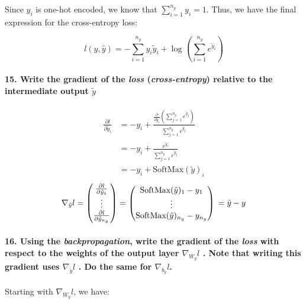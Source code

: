 Since $y_i$ is one-hot encoded, we know that $\sum_{i=1}^{n_y} y_i = 1$. Thus, we have the final expression for the cross-entropy loss:

\[ l(y, \hat{y}) = - \sum_{i=1}^{n_y} y_i \tilde{y}_i + \log_{} \left(\sum_{i=1}^{n_y} e^{\tilde{y}_i}\right) \]

\paragraph{15. Write the gradient of the \textit{loss} (\textit{cross-entropy}) relative to the intermediate output $ \tilde{y} $ }
\begin{align*}
    \frac{\partial l}{\partial \tilde{y}_i} & = -y_i + \frac{\frac{\partial }{\partial \tilde{y}_i } (\sum_{j=1}^{n_y} e^{ \tilde{y}_j })}{\sum_{j=1}^{n_y} e^{ \tilde{y}_j }} \\
                                            & = - y_i + \frac{e^{\tilde{y}_i}}{\sum_{j=1}^{n_y} e^{ \tilde{y}_j}}                                                          \\
                                            & = - y_i + \text{SoftMax}(\tilde{y})_i
\end{align*}
\[
    \nabla _{\tilde{y}}l = \begin{pmatrix}
        \frac{\partial l}{\partial \tilde{y}_1} \\
        \vdots                                  \\
        \frac{\partial l}{\partial \tilde{y}_{n_y}}
    \end{pmatrix} = \begin{pmatrix}
        \text{SoftMax}(\tilde{y})_1 - y_1 \\
        \vdots                            \\
        \text{SoftMax}(\tilde{y})_{n_y} - y_{n_y}
    \end{pmatrix} \\
    = \hat{y} - y
\]

\paragraph{16. Using the \textit{backpropagation}, write the gradient of the \textit{loss} with respect to the weights of the output layer $ \nabla _{W_y}l $ . Note that writing this gradient uses $ \nabla _{\tilde{y}}l $ . Do the same for $ \nabla _{b_y}l $.\\}

Starting with \( \nabla _{W_y} l \), we have:

